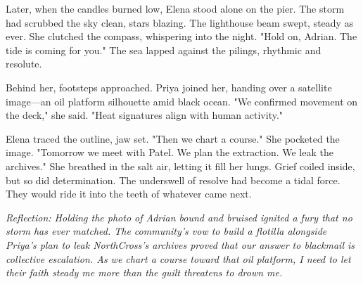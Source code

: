 Later, when the candles burned low, Elena stood alone on the pier. The storm had scrubbed the sky clean, stars blazing. The lighthouse beam swept, steady as ever. She clutched the compass, whispering into the night. "Hold on, Adrian. The tide is coming for you." The sea lapped against the pilings, rhythmic and resolute.

Behind her, footsteps approached. Priya joined her, handing over a satellite image—an oil platform silhouette amid black ocean. "We confirmed movement on the deck," she said. "Heat signatures align with human activity."

Elena traced the outline, jaw set. "Then we chart a course." She pocketed the image. "Tomorrow we meet with Patel. We plan the extraction. We leak the archives." She breathed in the salt air, letting it fill her lungs. Grief coiled inside, but so did determination. The underswell of resolve had become a tidal force. They would ride it into the teeth of whatever came next.


\noindent\textit{Reflection: Holding the photo of Adrian bound and bruised ignited a fury that no storm has ever matched. The community's vow to build a flotilla alongside Priya's plan to leak NorthCross's archives proved that our answer to blackmail is collective escalation. As we chart a course toward that oil platform, I need to let their faith steady me more than the guilt threatens to drown me.}
